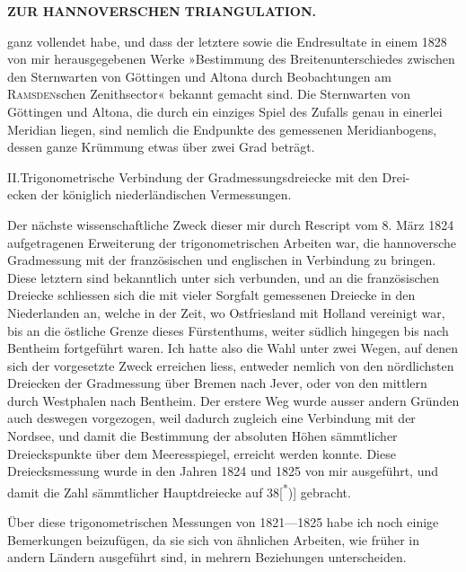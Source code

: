 \par\clearpage
\noindent\null\hfill{\small\textbf{ZUR HANNOVERSCHEN TRIANGULATION.}}\hfill{}\par\medskip

\noindent ganz vollendet habe, und dass der letztere sowie die Endresultate in einem 1828 von mir herausgegebenen Werke »Bestimmung des Breitenunterschiedes zwischen den Sternwarten von Göttingen und Altona durch Beobachtungen am \textsc{Ramsden}schen Zenithsector« bekannt gemacht sind. Die Sternwarten von Göttingen und Altona, die durch ein einziges Spiel des Zufalls genau in einerlei Meridian liegen, sind nemlich die Endpunkte des gemessenen Meridianbogens, dessen ganze Krümmung etwas über zwei Grad beträgt.

\begin{center}
II.\quad Trigonometrische Verbindung der Gradmessungsdreiecke mit den Drei-\\
ecken der königlich niederländischen Vermessungen.
\end{center}

\par\noindent\hspace*{\parindent}Der nächste wissenschaftliche Zweck dieser mir durch Rescript vom 8. März 1824 aufgetragenen Erweiterung der trigonometrischen Arbeiten war, die hannoversche Gradmessung mit der französischen und englischen in Verbindung zu bringen. Diese letztern sind bekanntlich unter sich verbunden, und an die französischen Dreiecke schliessen sich die mit vieler Sorgfalt gemessenen Dreiecke in den Niederlanden an, welche in der Zeit, wo Ostfriesland mit Holland vereinigt war, bis an die östliche Grenze dieses Fürstenthums, weiter südlich hingegen bis nach Bentheim fortgeführt waren. Ich hatte also die Wahl unter zwei Wegen, auf denen sich der vorgesetzte Zweck erreichen liess, entweder nemlich von den nördlichsten Dreiecken der Gradmessung über Bremen nach Jever, oder von den mittlern durch Westphalen nach Bentheim. Der erstere Weg wurde ausser andern Gründen auch deswegen vorgezogen, weil dadurch zugleich eine Verbindung mit der Nordsee, und damit die Bestimmung der absoluten Höhen sämmtlicher Dreieckspunkte über dem Meeresspiegel, erreicht werden konnte. Diese Dreiecksmessung wurde in den Jahren 1824 und 1825 von mir ausgeführt, und damit die Zahl sämmtlicher Hauptdreiecke auf 38[\textsuperscript{*})] gebracht.

\par\medskip
\par\noindent\hspace*{\parindent}Über diese trigonometrischen Messungen von 1821---1825 habe ich noch einige Bemerkungen beizufügen, da sie sich von ähnlichen Arbeiten, wie früher in andern Ländern ausgeführt sind, in mehrern Beziehungen unterscheiden.

